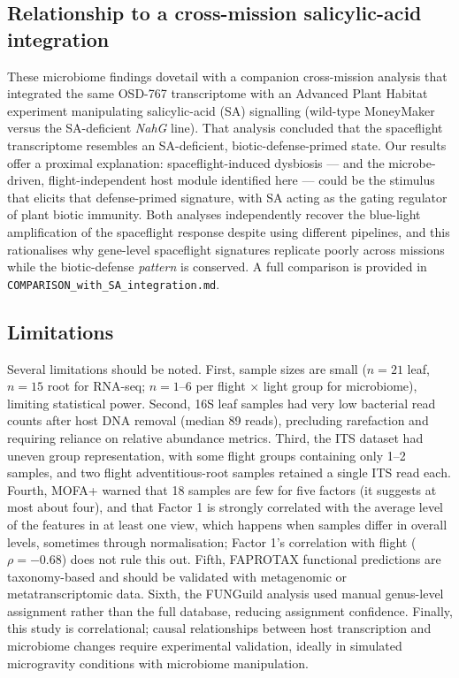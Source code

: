 \documentclass[pdflatex,sn-nature]{sn-jnl}
\begin{document}
\subsection{Relationship to a cross-mission salicylic-acid integration}
These microbiome findings dovetail with a companion cross-mission analysis that
integrated the same OSD-767 transcriptome with an Advanced Plant Habitat experiment
manipulating salicylic-acid (SA) signalling (wild-type MoneyMaker versus the
SA-deficient \textit{NahG} line). That analysis concluded that the spaceflight
transcriptome resembles an SA-deficient, biotic-defense-primed state. Our results
offer a proximal explanation: spaceflight-induced dysbiosis --- and the
microbe-driven, flight-independent host module identified here --- could be the
stimulus that elicits that defense-primed signature, with SA acting as the gating
regulator of plant biotic immunity. Both analyses independently recover the
blue-light amplification of the spaceflight response despite using different
pipelines, and this rationalises why gene-level spaceflight signatures replicate
poorly across missions while the biotic-defense \textit{pattern} is conserved. A full
comparison is provided in \texttt{COMPARISON\_with\_SA\_integration.md}.

\subsection{Limitations}
Several limitations should be noted. First, sample sizes are small (\(n = 21\) leaf,
\(n = 15\) root for RNA-seq; \(n = 1\)--6 per flight \(\times\) light group for microbiome), limiting
statistical power. Second, 16S leaf samples had very low bacterial read counts after
host DNA removal (median 89 reads), precluding rarefaction and requiring reliance on
relative abundance metrics. Third, the ITS dataset had uneven group representation,
with some flight groups containing only 1--2 samples, and two flight adventitious-root samples
retained a single ITS read each. Fourth, MOFA+ warned that
18 samples are few for five factors (it suggests at most about four), and that Factor 1 is
strongly correlated with the average level of the features in at least one view, which happens
when samples differ in overall levels, sometimes through normalisation; Factor 1's correlation
with flight (\(\rho = -0.68\)) does not rule this out.
Fifth, FAPROTAX functional predictions are taxonomy-based and should be validated
with metagenomic or metatranscriptomic data. Sixth, the FUNGuild analysis used
manual genus-level assignment rather than the full database, reducing assignment
confidence. Finally, this study is correlational; causal relationships between host
transcription and microbiome changes require experimental validation, ideally in
simulated microgravity conditions with microbiome manipulation.
\end{document}
